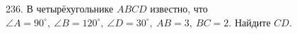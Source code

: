 236. В четырёхугольнике $ABCD$ известно, что $\angle A=90^\circ,\ \angle B=120^\circ,\ \angle D=30^\circ,\ AB=3,\ BC=2.$ Найдите $CD.$\\
